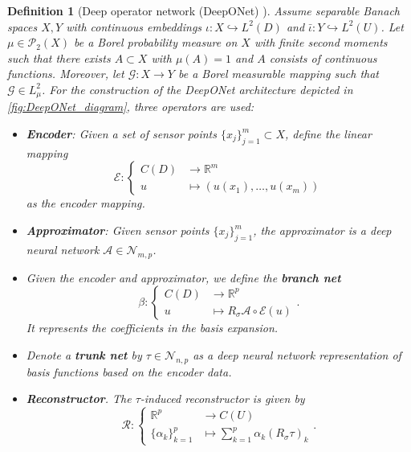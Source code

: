 \documentclass[12pt]{article}
\newtheorem{definition}[theorem]{Definition}
\theoremstyle{remark}
\theoremstyle{plain}
\numberwithin{equation}{section}
\newcommand{\R}{\mathbb{R}}
\begin{document}
\begin{definition}[{Deep operator network (DeepONet) \cite[Definitions~2.1 \& 2.4]{lanthalerErrorEstimatesDeepONets2022}}]\label{def:deeponets}
    Assume separable Banach spaces $X,Y$ with continuous embeddings $\iota : X \hookrightarrow L^2(D)$ and $\bar\iota : Y \hookrightarrow L^2(U)$.
    Let $\mu \in \mathcal P_2(X)$ be a Borel probability measure on $X$ with finite second moments such that there exists $A \subset X$ with $\mu(A)=1$ and $A$ consists of continuous functions.
    Moreover, let $\mathcal G : X \to Y$ be a Borel measurable mapping such that $\mathcal G \in L_\mu^2$.
    For the construction of the DeepONet architecture depicted in \cref{fig:DeepONet_diagram}, three \emph{operators} are used:
    \begin{itemize}
        \item \textbf{Encoder}: Given a set of \emph{sensor} points $\{x_j\}_{j=1}^m\subset X$, define the linear mapping
        \begin{equation}
            \mathcal E : \left\{
            \begin{array}{rl}
                C(D) & \longrightarrow \R^m \\
                u & \longmapsto (u(x_1), \dots, u(x_m))
            \end{array}
            \right.
            \label{eq:deeponet_encoder}
        \end{equation}
        as the \emph{encoder} mapping.
        \item \textbf{Approximator}: Given sensor points $\{x_j\}_{j=1}^m$, the \emph{approximator} is a deep neural network $\mathcal A \in \mathcal N_{m,p}$.
        \item Given the encoder and approximator, we define the \textbf{branch net} \begin{equation}
            \beta : \left\{
            \begin{array}{rl}
                C(D) & \longrightarrow \R^p \\
                u & \longmapsto R_\sigma \mathcal A \circ \mathcal E(u)
            \end{array}
            \right..
            \label{eq:deeponet_branch}
        \end{equation}
        It represents the coefficients in the basis expansion.
        \item Denote a \textbf{trunk net} by $\tau \in \mathcal N_{n,p}$ as a deep neural network representation of basis functions based on the encoder data.
        \item \textbf{Reconstructor}. The $\tau$-induced \emph{reconstructor} is given by
        \begin{equation}
            \mathcal R : \left\{
            \begin{array}{rl}
                \R^p & \longrightarrow C(U) \\
                \{\alpha_k\}_{k=1}^p & \longmapsto \sum_{k=1}^p \alpha_k (R_\sigma \tau)_k
            \end{array}
            \right. .
            \label{eq:deeponet_reconstructor}
        \end{equation}
    \end{itemize}


\end{definition}
\end{document}
